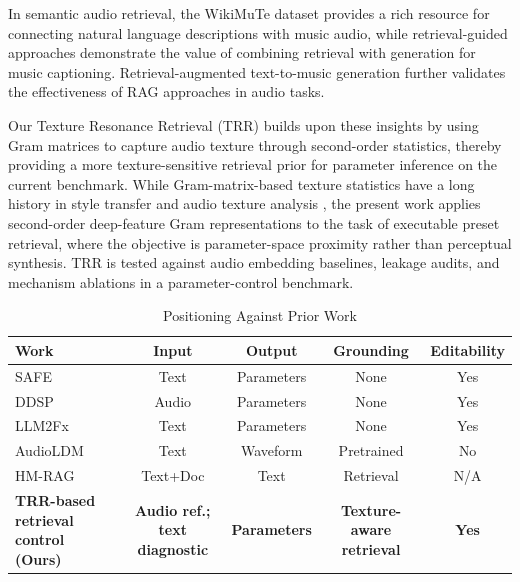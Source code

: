 In semantic audio retrieval, the WikiMuTe dataset \citep{weck2023wikimute} provides a rich resource for connecting natural language descriptions with music audio, while retrieval-guided approaches \citep{srivatsan2024retrieval} demonstrate the value of combining retrieval with generation for music captioning. Retrieval-augmented text-to-music generation \citep{gonzales2024rag} further validates the effectiveness of RAG approaches in audio tasks.

Our Texture Resonance Retrieval (TRR) builds upon these insights by using Gram matrices to capture audio texture through second-order statistics, thereby providing a more texture-sensitive retrieval prior for parameter inference on the current benchmark. While Gram-matrix-based texture statistics have a long history in style transfer and audio texture analysis \citep{gatys2015style,stylianou2015audio,mcwec2023texture}, the present work applies second-order deep-feature Gram representations to the task of executable preset retrieval, where the objective is parameter-space proximity rather than perceptual synthesis. TRR is tested against audio embedding baselines, leakage audits, and mechanism ablations in a parameter-control benchmark.

\begin{table}[t]
			\centering
			\caption{Positioning Against Prior Work}
			\label{tab:positioning}
		\small
		\begin{tabular}{lcccc}
		\toprule
		\textbf{Work}               & \textbf{Input}      & \textbf{Output}     & \textbf{Grounding}      & \textbf{Editability} \\
		\midrule
		SAFE \citep{stables2014semantic}             & Text                                 & Parameters                           & None                                     & Yes                                   \\
		DDSP \citep{engel2020ddsp}                   & Audio                                & Parameters                           & None                                     & Yes                                   \\
		LLM2Fx \citep{doh2025llm2fx}                 & Text                                 & Parameters                           & None                                     & Yes                                   \\
		AudioLDM \citep{liu2023audioldm}             & Text                                 & Waveform                             & Pretrained                               & No                                    \\
		HM-RAG \citep{liu2025hmrag}                  & Text+Doc                             & Text                                 & Retrieval                                & N/A                                   \\
			\midrule
			\textbf{TRR-based retrieval control (Ours)} & \textbf{Audio ref.; text diagnostic} & \textbf{Parameters} & \textbf{Texture-aware retrieval} & \textbf{Yes}         \\
			\bottomrule
		\end{tabular}
\end{table}

